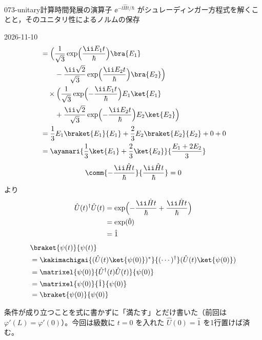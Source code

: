 \documentclass[uplatex,dvipdfmx,a4paper,11pt]{jsarticle}
\begin{document}
\begin{mondai}{073-unitary}{計算}{時間発展の演算子 $\ee^{-\ii\hat{H}t/\hbar}$ がシュレーディンガー方程式を解くことと，そのユニタリ性によるノルムの保存}
\begin{kotaeutsushi}{2026-11-10}
\begin{align*}
&=\Bigl(\frac{1}{\sqrt{3}}\exp\Bigl(\frac{\ii E_{1}t}{\hbar}\Bigr)\bra{E_{1}}\\
&\qquad-\frac{\ii\sqrt{2}}{\sqrt{3}}\exp\Bigl(\frac{\ii E_{2}t}{\hbar}\Bigr)\bra{E_{2}}\Bigr)\\
&\quad\times\Bigl(\frac{1}{\sqrt{3}}\exp\Bigl(-\frac{\ii E_{1}t}{\hbar}\Bigr)E_{1}\ket{E_{1}}\\
&\qquad+\frac{\ii\sqrt{2}}{\sqrt{3}}\exp\Bigl(-\frac{\ii E_{2}t}{\hbar}\Bigr)E_{2}\ket{E_{2}}\Bigr)\\
&=\frac{1}{3}E_{1}\braket{E_{1}}{E_{1}}+\frac{2}{3}E_{2}\braket{E_{2}}{E_{2}}+0+0\\
&=\ayamari{\frac{1}{3}\ket{E_{1}}+\frac{2}{3}\ket{E_{2}}}{\frac{E_{1}+2E_{2}}{3}}
\end{align*}
\[ \comm{-\frac{\ii\hat{H}t}{\hbar}}{\frac{\ii\hat{H}t}{\hbar}}=0 \]
より\quad{}
\begin{align*}
\hat{U}(t)^{\dagger}\hat{U}(t)&=\exp\Bigl(-\frac{\ii\hat{H}t}{\hbar}+\frac{\ii\hat{H}t}{\hbar}\Bigr)\\
&=\exp(\hat{0})\\
&=\hat{1}
\end{align*}
\begin{align*}
&\braket{\psi(t)}{\psi(t)}\\
&=\kakimachigai{(\hat{U}(t)\ket{\psi(0)})^{*}}{(\cdots)^{\dagger}}(\hat{U}(t)\ket{\psi(0)})\\
&=\matrixel{\psi(0)}{\hat{U}^{\dagger}(t)\hat{U}(t)}{\psi(0)}\\
&=\matrixel{\psi(0)}{\hat{1}}{\psi(0)}\\
&=\braket{\psi(0)}{\psi(0)}
\end{align*}
\end{kotaeutsushi}
\begin{kizuki}
\item {} 条件が成り立つことを式に書かずに「満たす」とだけ書いた（前回は $\varphi'(L)=\varphi'(0)$）。今回は級数に $t=0$ を入れた $\hat{U}(0)=\hat{1}$ を1行置けば済む。

\end{kizuki}
\end{mondai}
\end{document}
